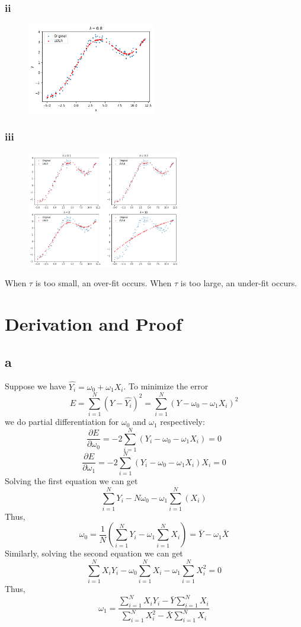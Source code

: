 \documentclass{article}
\begin{document}
\subsubsection*{ii}
\begin{figure}[htbp]
    \centering
    \includegraphics[width=0.5\textwidth]{2dii.png}
\end{figure}

\subsubsection*{iii}
\begin{figure}[htbp]
    \centering
    \includegraphics[width=0.6\textwidth]{2diii.png}
\end{figure}
When $\tau$ is too small, an over-fit occurs. When $\tau$ is too large, an under-fit occurs.

\newpage

\section{Derivation and Proof}

\subsection*{a}
Suppose we have $\widehat{Y_i} = \omega_0 + \omega_1 X_i$. To minimize the error 
$$E = \sum_{i=1}^{N}(Y - \widehat{Y_i})^2 = \sum_{i=1}^{N}(Y - \omega_0 - \omega_1 X_i)^2$$
we do partial differentiation for $\omega_0$ and $\omega_1$ respectively:
$$\frac{\partial E}{\partial \omega_0} = -2 \sum_{i=1}^{N}(Y_i - \omega_0 - \omega_1 X_i) = 0$$
$$\frac{\partial E}{\partial \omega_1} = -2 \sum_{i=1}^{N}(Y_i - \omega_0 - \omega_1 X_i) X_i = 0$$
Solving the first equation we can get
$$\sum_{i=1}^{N}Y_i - N\omega_0 - \omega_1\sum_{i=1}^{N}(X_i)$$
Thus,
$$\omega_0 = \frac{1}{N}(\sum_{i=1}^{N}Y_i - \omega_1 \sum_{i=1}^{N}X_i) = \bar{Y} - \omega_1 \bar{X}$$
Similarly, solving the second equation we can get
$$\sum_{i=1}^{N}X_i Y_i - \omega_0 \sum_{i=1}^{N}X_i - \omega_1 \sum_{i=1}^{N} X_i^2 = 0$$
Thus,
$$\omega_1 = \frac{\sum_{i=1}^{N}X_i Y_i - \bar{Y}\sum_{i=1}^{N}X_i}{\sum_{i=1}^{N}X_i^2 - \bar{X}\sum_{i=1}^{N}X_i}$$
\end{document}
